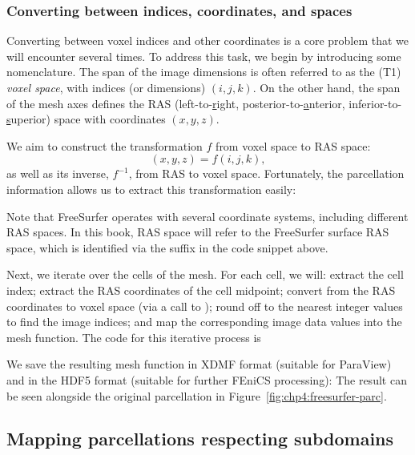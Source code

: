 \subsubsection*{Converting between indices, coordinates, and spaces}

Converting between voxel indices and other coordinates is a core
problem that we will encounter several times. To address this task, we
begin by introducing some nomenclature. The span of the image
dimensions is often referred to as the (T1) \emph{voxel space}, with
indices (or dimensions) $(i, j, k)$. On the other hand, the span of
the mesh axes defines the RAS (left-to-\underline{r}ight, 
posterior-to-\underline{a}nterior, inferior-to-\underline{s}uperior) space 
with coordinates $(x, y, z)$. 

We aim to
construct the transformation $f$ from voxel space to RAS space:
\begin{equation}
  (x, y, z) = f(i, j, k),
\end{equation}
as well as its inverse, $f^{-1}$, from RAS to voxel space. Fortunately,
the parcellation information allows us to extract this transformation easily:

\noindent Note that FreeSurfer operates with several coordinate
systems, including different RAS spaces. In this book, RAS space will
refer to the FreeSurfer surface RAS space, which is identified
via the suffix  in the code snippet above.

Next, we iterate over the cells of the mesh.  For each cell, we will: 
extract the cell index; extract the RAS coordinates of the cell 
midpoint; convert from the RAS coordinates to voxel space (via a call to 
); round off to the nearest integer values to find the 
image indices; and map the corresponding image data values into the 
 mesh function.  The code for this iterative process is

We save the resulting mesh function in XDMF format (suitable for
ParaView) and in the HDF5 format (suitable for further FEniCS processing): 
The result can be seen alongside the original parcellation in
Figure~\ref{fig:chp4:freesurfer-parc}.

\subsection{Mapping parcellations respecting subdomains}
\label{chp4:parcellations}


